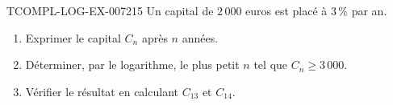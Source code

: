 \begin{exercice}{TCOMPL-LOG-EX-007}{2}{15}
Un capital de $2\,000$ euros est placé à $3\,\%$ par an.
\begin{enumerate}
  \item Exprimer le capital $C_n$ après $n$ années.
  \item Déterminer, par le logarithme, le plus petit $n$ tel que
        $C_n\geq3\,000$.
  \item Vérifier le résultat en calculant $C_{13}$ et $C_{14}$.
\end{enumerate}
\end{exercice}

